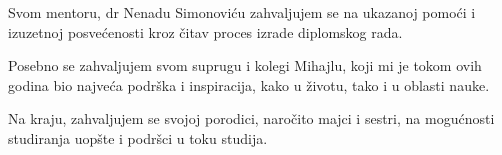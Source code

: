 {\it

{\noindent Svom mentoru, dr Nenadu Simonoviću zahvaljujem se na ukazanoj pomoći i izuzetnoj posvećenosti kroz čitav proces izrade diplomskog rada.

\noindent Posebno se zahvaljujem svom suprugu i kolegi Mihajlu, koji mi je tokom ovih godina bio najveća podrška i inspiracija, kako u životu, tako i u oblasti nauke.

\noindent Na kraju, zahvaljujem se svojoj porodici, naročito majci i sestri, na mogućnosti studiranja uopšte i podršci u toku studija.}
}